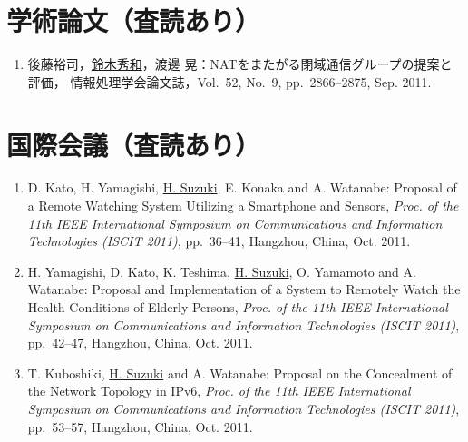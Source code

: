 
\section*{学術論文（査読あり）}
\begin{enumerate}
\item 後藤裕司，\underline{鈴木秀和}，渡邊 晃：NATをまたがる閉域通信グループの提案と評価，
情報処理学会論文誌，Vol.~52, No.~9, pp.\ 2866--2875, Sep. 2011.
\end{enumerate}


\section*{国際会議（査読あり）}
\begin{enumerate}
\item D. Kato, H. Yamagishi, \underline{H. Suzuki}, E. Konaka and A. Watanabe: 
Proposal of a Remote Watching System Utilizing a Smartphone and Sensors,
{\em Proc. of the 11th IEEE International Symposium on Communications and Information Technologies (ISCIT 2011)},
pp.\ 36--41, Hangzhou, China, Oct. 2011.

\item H. Yamagishi, D. Kato, K. Teshima, \underline{H. Suzuki}, O. Yamamoto and A. Watanabe: 
Proposal and Implementation of a System to Remotely Watch the Health Conditions of Elderly Persons,
{\em Proc. of the 11th IEEE International Symposium on Communications and Information Technologies (ISCIT 2011)},
pp.\ 42--47, Hangzhou, China, Oct. 2011.

\item T. Kuboshiki, \underline{H. Suzuki} and A. Watanabe: 
Proposal on the Concealment of the Network Topology in IPv6,
{\em Proc. of the 11th IEEE International Symposium on Communications and Information Technologies (ISCIT 2011)},
pp.\ 53--57, Hangzhou, China, Oct. 2011.
\end{enumerate}


